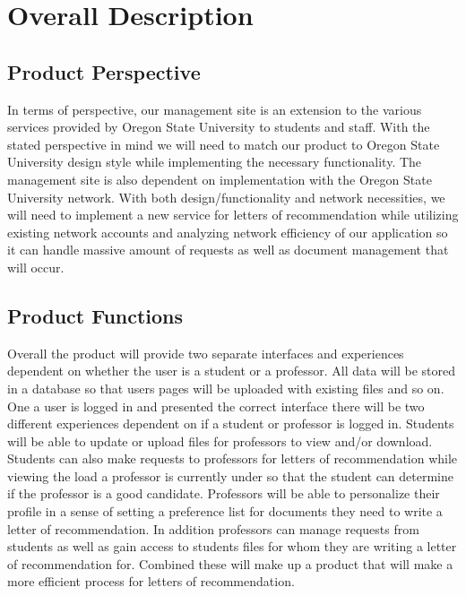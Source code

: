 \documentclass[onecolumn, draftclsnofoot,10pt, compsoc]{IEEEtran}
\begin{document}
\section{Overall Description}
\subsection{Product Perspective} 
In terms of perspective, our management site is an extension to the various services provided by Oregon State University to students and staff. With the stated perspective in mind we will need to match our product to Oregon State University design style while implementing the necessary functionality. The management site is also dependent on implementation with the Oregon State University network. With both design/functionality and network necessities, we will need to implement a new service for letters of recommendation while utilizing existing network accounts and analyzing network efficiency of our application so it can handle massive amount of requests as well as document management that will occur. 

\subsection{Product Functions}
Overall the product will provide two separate interfaces and experiences dependent on whether the user is a student or a professor. All data will be stored in a database so that users pages will be uploaded with existing files and so on. One a user is logged in and presented the correct interface there will be two different experiences dependent on if a student or professor is logged in. Students will be able to update or upload files for professors to view and/or download. Students can also make requests to professors for letters of recommendation while viewing the load a professor is currently under so that the student can determine if the professor is a good candidate. Professors will be able to personalize their profile in a sense of setting a preference list for documents they need to write a letter of recommendation. In addition professors can manage requests from students as well as gain access to students files for whom they are writing a letter of recommendation for. Combined these will make up a product that will make a more efficient process for letters of recommendation. 
\end{document}
